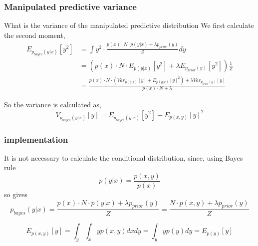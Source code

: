 \subsubsection{Manipulated predictive variance}
What is the variance of the manipulated predictive distribution
We first calculate the second moment, 
\begin{align*}
    E_{p_{bayes}(y|x)}[y^2] &= \int y^2 \cdot \frac{p(x)\cdot N \cdot p(y|x) + \lambda p_{prior}(y)}{Z} dy\\
    &= (p(x)\cdot N\cdot E_{p(y|x)}[y^2] + \lambda E_{p_{prior}(y)}[y^2] ) \frac{1}{Z}\\
    &= \frac{p(x)\cdot N \cdot(Var_{p(y|x)}[y]+E_{p(y|x)}[y]^2) + \lambda Var_{p_{prior}(y)}[y]}{p(x)\cdot N+\lambda}
\end{align*}

So the variance is calculated as, 
$$V_{p_{bayes}(y|x)}[y] = E_{p_{bayes}(y|x)}[y^2] - E_{p(x,y)}[y]^2$$

\subsubsection*{implementation}
It is not necessary to calculate the conditional distribution, since, using Bayes rule
$$p(y|x) = \frac{p(x,y)}{p(x)}$$
so gives
$$p_{bayes}(y|x) = \frac{p(x)\cdot N \cdot p(y|x) + \lambda p_{prior}(y)}{Z} = \frac{N \cdot p(x,y) + \lambda p_{prior}(y)}{Z}$$

$$E_{p(x,y)}[y] = \int_y \int_x yp(x,y) dx dy = \int_y y p(y) dy = E_{p(y)}[y]$$

